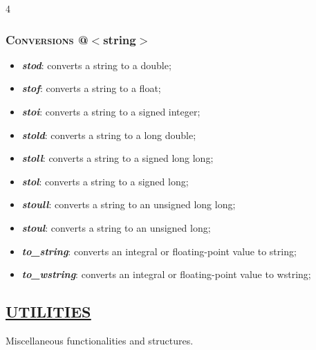 \documentclass[10pt]{article}
\newcommand{\softseparator}{%
  \par\noindent{\color{RuleGray}\rule{\linewidth}{0.35pt}}\vspace{1pt}
}
\begin{document}
\begin{multicols*}{4}
{\subsubsection*{\textsc{Conversions}  @$<$string$>$} 
\begin{itemize}[leftmargin=*,topsep=0.25pt]
  \setlength\itemsep{-1.8pt}
\item  \emph{\textbf{stod}}: converts a string to a double;
\item  \emph{\textbf{stof}}: converts a string to a float;
\item  \emph{\textbf{stoi}}: converts a string to a signed integer;
\item  \emph{\textbf{stold}}: converts a string to a long double;
\item  \emph{\textbf{stoll}}: converts a string to a signed long long;
\item  \emph{\textbf{stol}}: converts a string to a signed long;
\item  \emph{\textbf{stoull}}: converts a string to an unsigned long long;
\item  \emph{\textbf{stoul}}: converts a string to an unsigned long;
\item  \emph{\textbf{to\_string}}: converts an integral or floating-point value to string;
\item  \emph{\textbf{to\_wstring}}: converts an integral or floating-point value to wstring;
\end{itemize}

\softseparator

{\color{Blue}
\subsection*{\href{https://en.cppreference.com/w/cpp/utility}{\underline{UTILITIES}}}	
\noindent
Miscellaneous functionalities and structures.

}}
\end{multicols*}
\end{document}
